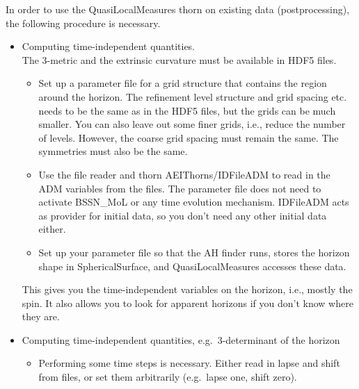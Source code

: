 In order to use the QuasiLocalMeasures thorn on existing data
(postprocessing), the following procedure is necessary.

\begin{itemize}

\item

Computing time-independent quantities.\\

The 3-metric and the extrinsic curvature must be available in HDF5
files.

\begin{itemize}

\item Set up a parameter file for a grid structure that contains the
  region around the horizon.  The refinement level structure and grid
  spacing etc. needs to be the same as in the HDF5 files, but the
  grids can be much smaller.  You can also leave out some finer grids,
  i.e., reduce the number of levels.  However, the coarse grid spacing
  must remain the same.  The symmetries must also be the same.

\item Use the file reader and thorn AEIThorns/IDFileADM to read in the
  ADM variables from the files.  The parameter file does not need to
  activate BSSN\_MoL or any time evolution mechanism.  IDFileADM acts
  as provider for initial data, so you don't need any other initial
  data either.

\item Set up your parameter file so that the AH finder runs, stores
  the horizon shape in SphericalSurface,
  and QuasiLocalMeasures accesses these data.\\

\end{itemize}

This gives you the time-independent variables on the horizon, i.e.,
mostly the spin.  It also allows you to look for apparent horizons if
you don't know where they are.


\item
  Computing time-independent quantities, e.g.\ 3-determinant of the horizon\\

\begin{itemize}

\item Performing some time steps is necessary. Either read in lapse
  and shift from files, or set them arbitrarily (e.g.\ lapse one,
  shift zero).


\end{itemize}
\end{itemize}
